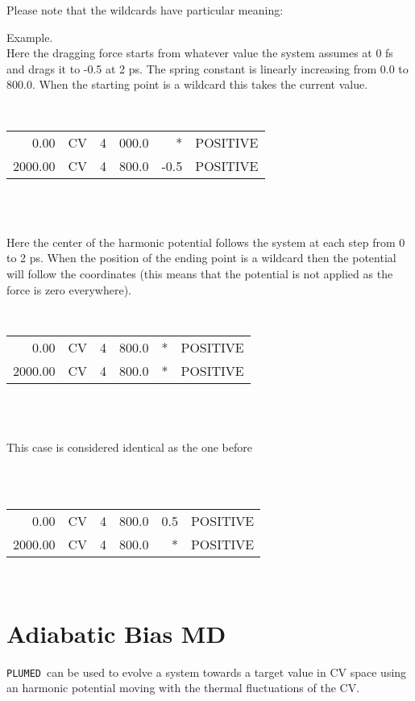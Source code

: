 \documentclass[12pt,fleqn]{report}
\newcommand{\plumed}{{\tt PLUMED}}
\newcommand{\esempio}[1]{
\vspace{10pt}
\begin{flushright}
\colorbox{light-gray}{
   \begin{minipage}{13cm}
       \scriptsize{
{\fontfamily{phv} \fontseries{b}
 \selectfont Example. \\
 \fontseries{m} \selectfont #1 } }
\end{minipage}}
\end{flushright}
\vspace{20pt}
}
\begin{document}
Please note that the wildcards have particular meaning:
\esempio{Here the dragging force starts from whatever value the system assumes at 0 fs 
and drags it to -0.5 at 2 ps. The spring constant is linearly increasing from 0.0 to 800.0. 
When the starting point is a wildcard this takes the current value. 
 \vspace{10pt}\\
{\tt
\begin{tabular} {r  r r r r r  }
      0.00 & CV &  4 &  000.0 &   *    &   POSITIVE    \\
   2000.00 & CV &  4 &  800.0 &  -0.5  &   POSITIVE    \\
\end{tabular}\\
}
 \vspace{10pt}\\
Here the center of the harmonic potential follows the system at each step from 0 to 2 ps. 
When the position of the ending point is a wildcard then the potential will 
follow the coordinates (this means that the potential is not applied as the force is zero everywhere). 
 \vspace{10pt}\\
{\tt
\begin{tabular} {r  r r r r r }
      0.00 & CV &  4 &  800.0 &   *    &   POSITIVE    \\
   2000.00 & CV &  4 &  800.0 &   *    &   POSITIVE    \\
\end{tabular}\\
}
 \vspace{10pt}\\
This case is considered identical as the one before \\
 \vspace{10pt}\\
{\tt
\begin{tabular} {r  r r r r r  }
      0.00 & CV &  4 &  800.0 &   0.5  &   POSITIVE    \\
   2000.00 & CV &  4 &  800.0 &   *    &   POSITIVE    \\
\end{tabular}\\
}
}


\section{Adiabatic Bias MD}
\plumed \ can be used to evolve a system towards a target value in
CV space using an harmonic potential moving with the thermal fluctuations of the CV\cite{ballone}.
\end{document}

